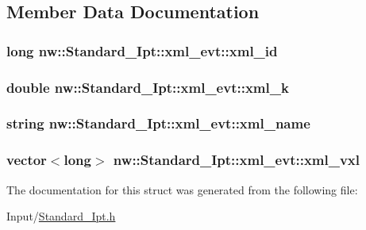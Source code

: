\subsection{Member Data Documentation}
\hypertarget{structnw_1_1_standard___ipt_1_1xml__evt_a7e6815f357b9eae3220c0f4d1f9f6dbd}{
\subsubsection[{xml\+\_\+id}]{\setlength{\rightskip}{0pt plus 5cm}long nw\+::\+Standard\+\_\+\+Ipt\+::xml\+\_\+evt\+::xml\+\_\+id}}\label{structnw_1_1_standard___ipt_1_1xml__evt_a7e6815f357b9eae3220c0f4d1f9f6dbd}
\hypertarget{structnw_1_1_standard___ipt_1_1xml__evt_af8a72fd81f09d6924703af53ad3689ee}{
\subsubsection[{xml\+\_\+k}]{\setlength{\rightskip}{0pt plus 5cm}double nw\+::\+Standard\+\_\+\+Ipt\+::xml\+\_\+evt\+::xml\+\_\+k}}\label{structnw_1_1_standard___ipt_1_1xml__evt_af8a72fd81f09d6924703af53ad3689ee}
\hypertarget{structnw_1_1_standard___ipt_1_1xml__evt_a2d2a44e9bedde8ef00af81617b057cb9}{
\subsubsection[{xml\+\_\+name}]{\setlength{\rightskip}{0pt plus 5cm}string nw\+::\+Standard\+\_\+\+Ipt\+::xml\+\_\+evt\+::xml\+\_\+name}}\label{structnw_1_1_standard___ipt_1_1xml__evt_a2d2a44e9bedde8ef00af81617b057cb9}
\hypertarget{structnw_1_1_standard___ipt_1_1xml__evt_aafc49103df741f710fa1eb6a806f9c24}{
\subsubsection[{xml\+\_\+vxl}]{\setlength{\rightskip}{0pt plus 5cm}vector$<$long$>$ nw\+::\+Standard\+\_\+\+Ipt\+::xml\+\_\+evt\+::xml\+\_\+vxl}}\label{structnw_1_1_standard___ipt_1_1xml__evt_aafc49103df741f710fa1eb6a806f9c24}


The documentation for this struct was generated from the following file\+:\begin{DoxyCompactItemize}
\item 
Input/\hyperlink{_standard___ipt_8h}{Standard\+\_\+\+Ipt.\+h}\end{DoxyCompactItemize}
